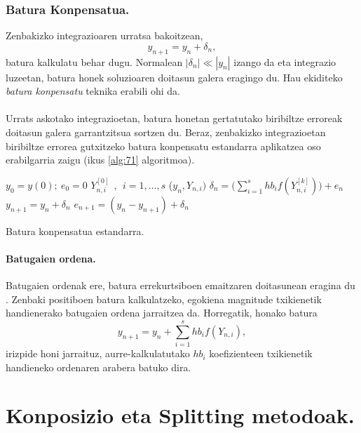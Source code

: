 \subsubsection*{Batura Konpensatua.}

Zenbakizko integrazioaren urratsa bakoitzean,
\begin{equation*}
y_{n+1}=y_{n}+ \delta_n,
\end{equation*}
batura kalkulatu behar dugu. Normalean $|\delta_n|\ll |y_n| $ izango da eta integrazio luzeetan, batura honek soluzioaren doitasun galera eragingo du. Hau ekiditeko \emph{batura konpensatu} teknika erabili ohi da.

\paragraph*{}Urrats askotako integrazioetan, batura honetan gertatutako biribiltze erroreak doitasun galera garrantzitsua sortzen du. Beraz, zenbakizko integrazioetan biribiltze errorea gutxitzeko  batura konpensatu estandarra aplikatzea oso erabilgarria zaigu (ikus \ref{alg:71} algoritmoa).

\begin{algorithm}[h]
 \BlankLine
  $y_0=y(0); \ {e}_{0}=0$\;
  \BlankLine
  {
     $Y_{n,i}^{[0]} \ \ , \ \ i=1,\dots,s $\;
    ($y_n, Y_{n,i})$ \;
   \BlankLine
    ${\delta}_{n}= \big(\sum\limits_{i=1}^{s} hb_i f(Y_{n,i}^{[k]})\big) +  {e}_{n} $\;
    ${y}_{n+1}={y}_{n} + {\delta}_n$\;
    ${e}_{n+1}=({y}_{n} - {y}_{n+1})+ {\delta}_n$\;            
   \BlankLine
 }
 \caption{Batura konpensatua estandarra.}
 \label{alg:71}
\end{algorithm}

\paragraph*{Batugaien ordena.}
Batugaien ordenak ere, batura errekurtsiboen emaitzaren doitasunean eragina du \cite{Higham2002}. Zenbaki positiboen batura kalkulatzeko, egokiena magnitude txikienetik handienerako batugaien ordena jarraitzea da. Horregatik, honako batura
\begin{equation*}
y_{n+1}=y_n+\sum\limits_{i=1}^{s} hb_i f(Y_{n,i}),
\end{equation*}
irizpide honi jarraituz, aurre-kalkulatutako $hb_i$ koefizienteen txikienetik handieneko ordenaren arabera batuko dira. 
 

\section{Konposizio eta Splitting metodoak.}

